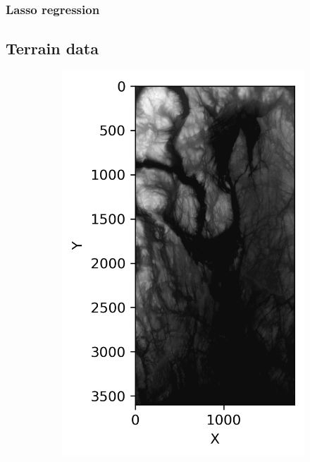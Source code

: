 \documentclass[../main.tex]{subfiles}
\begin{document}
\subsubsection{Lasso regression}

\subsection{Terrain data}
\begin{figure}[htb] 
   \centering
   \begin{subfigure}[b]{0.45\textwidth}
    \centering
    \includegraphics[width=\textwidth]{../assets/terrain_n59_e010.png} 
    \caption{}
    \label{fig:terrain_Norway}
   \end{subfigure}

\end{figure}
\end{document}
